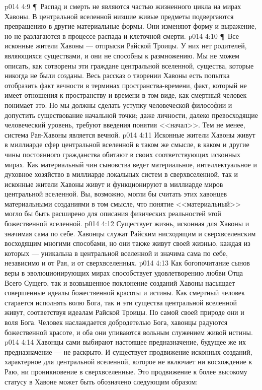 \vs p014 4:9 \P\ Распад и смерть не являются частью жизненного цикла на мирах Хавоны. В центральной вселенной низшие живые предметы подвергаются превращению в другие материальные формы. Они изменяют форму и выражение, но не разлагаются в процессе распада и клеточной смерти.
\vs p014 4:10 \P\ Все исконные жители Хавоны --- отпрыски Райской Троицы. У них нет родителей, являющихся существами, и они не способны к размножению. Мы не можем описать, как сотворены эти граждане центральной вселенной, существа, которые никогда не были созданы. Весь рассказ о творении Хавоны есть попытка отобразить факт вечности в терминах пространства\hyp{}времени, факт, который не имеет отношения к пространству и времени в том виде, как смертный человек понимает это. Но мы должны сделать уступку человеческой философии и допустить существование начальной точки; даже личности, далеко превосходящие человеческий уровень, требуют введения понятия <<начал>>. Тем не менее, система Рая\hyp{}Хавоны является вечной.
\vs p014 4:11 Исконные жители Хавоны живут в миллиарде сфер центральной вселенной в таком же смысле, в каком и другие чины постоянного гражданства обитают в своих соответствующих исконных мирах. Как материальный чин сыновства ведет материальное, интеллектуальное и духовное хозяйство в миллиарде локальных систем в сверхвселенной, так и исконные жители Хавоны живут и функционируют в миллиарде миров центральной вселенной. Вы, возможно, могли бы считать этих хавонцев материальными созданиями в том смысле, что понятие <<материальный>> могло бы быть расширено для описания физических реальностей этой божественной вселенной.
\vs p014 4:12 Существует жизнь, исконная для Хавоны и значимая сама по себе. Хавонцы служат Райским нисходящим и сверхвселенским восходящим многими способами, но они также живут своей жизнью, каждая из которых --- уникальна в центральной вселенной и значима сама по себе, независимо и от Рая, и от сверхвселенных.
\vs p014 4:13 Как богопочитание сынов веры в эволюционирующих мирах способствует удовлетворению любви Отца Всего Сущего, так и возвышенное поклонение созданий Хавоны насыщает совершенные идеалы божественной красоты и истины. Как смертный человек старается исполнять волю Бога, так и эти существа центральной вселенной живут, соответствуя идеалам Райской Троицы. По самой своей природе они и  воля Бога. Человек наслаждается добродетелью Бога, хавонцы радуются божественной красоте, и оба они упиваются вольным служением живой истины.
\vs p014 4:14 Хавонцы сами выбирают настоящее предназначение, будущее же их предназначение --- не раскрыто. И существует продвижение исконных созданий, характерное для центральной вселенной, которое не включает ни восхождение к Раю, ни проникновение в сверхвселенные. Это продвижение к более высокому статусу в Хавоне может быть обозначено следующим образом:
